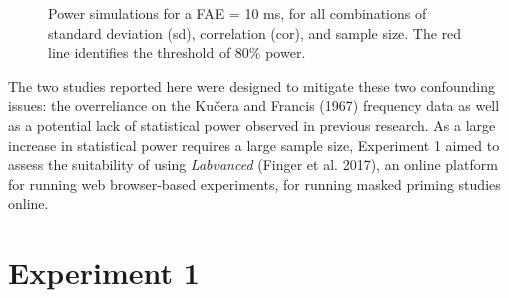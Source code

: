 \documentclass[
]{interact}
\begin{document}
\label{cell-fig-power}
\begin{figure}[H]


\caption{\label{fig-power}Power simulations for a FAE = 10 ms, for all
combinations of standard deviation (sd), correlation (cor), and sample
size. The red line identifies the threshold of 80\% power.}

\end{figure}%

The two studies reported here were designed to mitigate these two
confounding issues: the overreliance on the Kučera and Francis (1967)
frequency data as well as a potential lack of statistical power observed
in previous research. As a large increase in statistical power requires
a large sample size, Experiment 1 aimed to assess the suitability of
using \emph{Labvanced} (Finger et al. 2017), an online platform for
running web browser-based experiments, for running masked priming
studies online.

\section{Experiment 1}\label{sec-exp1}
\end{document}

